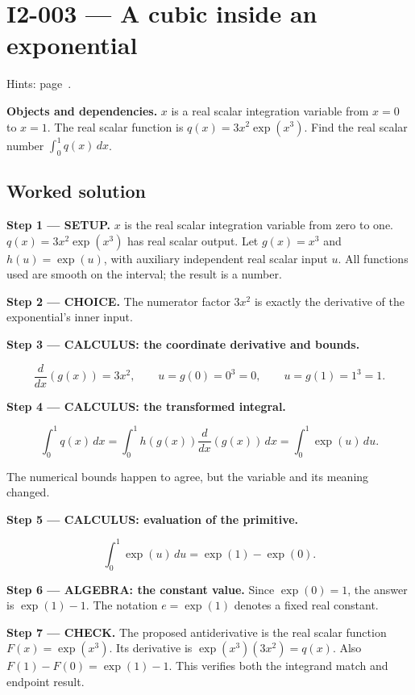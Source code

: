 \documentclass[11pt,oneside,openany]{book}
\begin{document}
\section{I2-003 --- A cubic inside an exponential}
\label{problem:I2-003}
{\small Hints: page~\pageref{hints:I2-003}.}\par\medskip

\textbf{Objects and dependencies.} \(x\) is a real scalar integration variable from
\(x=0\) to \(x=1\). The real scalar function is \(q(x)=3x^2\exp(x^3)\).
Find the real scalar number \(\int_0^1q(x)\,dx\).
\subsection*{Worked solution}

\textbf{Step 1 --- SETUP.} \(x\) is the real scalar integration variable from zero to one.
\(q(x)=3x^2\exp(x^3)\) has real scalar output. Let \(g(x)=x^3\) and
\(h(u)=\exp(u)\), with auxiliary independent real scalar input \(u\).
All functions used are smooth on the interval; the result is a number.

\begin{ChoiceStep}
\textbf{Step 2 --- CHOICE.} The numerator factor \(3x^2\) is exactly the derivative
of the exponential's inner input.

\end{ChoiceStep}
\textbf{Step 3 --- CALCULUS: the coordinate derivative and bounds.}

\[
\frac{d}{dx}\left(g(x)\right)=3x^2,\qquad
u=g(0)=0^3=0,\qquad u=g(1)=1^3=1.
\]

\textbf{Step 4 --- CALCULUS: the transformed integral.}

\[
\int_0^1q(x)\,dx
=\int_0^1h(g(x))\frac{d}{dx}\left(g(x)\right)\,dx
=\int_0^1\exp(u)\,du.
\]

The numerical bounds happen to agree, but the variable and its meaning changed.

\textbf{Step 5 --- CALCULUS: evaluation of the primitive.}

\[
\int_0^1\exp(u)\,du=\exp(1)-\exp(0).
\]

\begingroup\color{AlgebraBlue}
\textbf{Step 6 --- ALGEBRA: the constant value.} Since \(\exp(0)=1\), the
answer is \(\exp(1)-1\). The notation \(e=\exp(1)\) denotes a fixed real constant.

\endgroup
\textbf{Step 7 --- CHECK.} The proposed antiderivative is the real scalar function \(F(x)=\exp(x^3)\).
Its derivative is \(\exp(x^3)(3x^2)=q(x)\). Also
\(F(1)-F(0)=\exp(1)-1\). This verifies both the integrand match and endpoint result.
\clearpage
\end{document}
